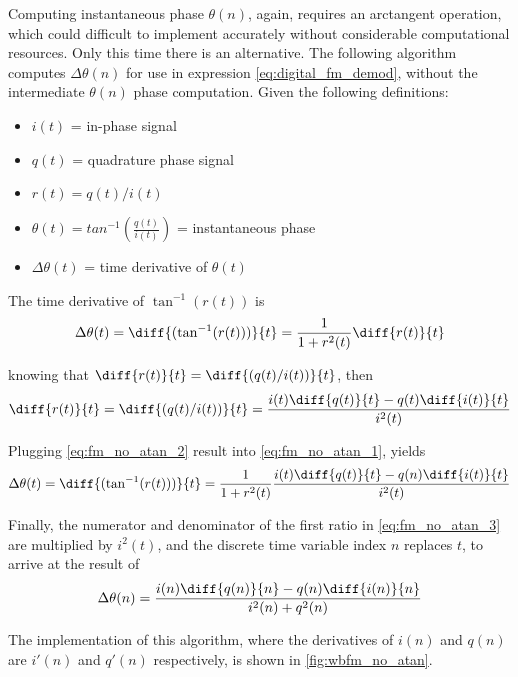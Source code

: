 Computing instantaneous phase $\theta(n)$, again, requires an arctangent operation, which could difficult to implement accurately without considerable computational resources. Only this time there is an alternative. The following algorithm computes $\Delta\theta(n)$ for use in expression \eqref{eq:digital_fm_demod}, without the intermediate $\theta(n)$ phase computation. Given the following definitions:
\begin{itemize}
  \item $i(t)$ = in-phase signal
  \item $q(t)$ = quadrature phase signal
  \item $r(t)=q(t)/i(t)$
  \item $\theta(t) = tan^{-1}\left(\frac{q(t)}{i(t)}\right)$ = instantaneous phase
  \item $\Delta\theta(t)$ = time derivative of $\theta(t)$
\end{itemize}

The time derivative of $\tan^{-1}(r(t))$ is
\begin{equation} \label{eq:fm_no_atan_1}
  \Delta\theta(t) = \diff{(\tan^{-1}(r(t)))}{t}=\frac{1}{1+r^2(t)}\diff{r(t)}{t}
\end{equation}

knowing that $\diff{r(t)}{t}=\diff{(q(t)/i(t))}{t}$, then
\begin{equation} \label{eq:fm_no_atan_2}
  \diff{r(t)}{t} = \diff{(q(t)/i(t))}{t} = \frac{i(t)\diff{q(t)}{t}-q(t)\diff{i(t)}{t}}{i^2(t)}
\end{equation}

Plugging \eqref{eq:fm_no_atan_2} result into \eqref{eq:fm_no_atan_1}, yields
\begin{equation} \label{eq:fm_no_atan_3}
  \Delta\theta(t) = \diff{(\tan^{-1}(r(t)))}{t}=\frac{1}{1+r^2(t)}\frac{i(t)\diff{q(t)}{t}-q(n)\diff{i(t)}{t}}{i^2(t)}
\end{equation}

Finally, the numerator and denominator of the first ratio in \eqref{eq:fm_no_atan_3} are multiplied by $i^2(t)$, and the discrete time variable index $n$ replaces $t$, to arrive at the result of
\begin{equation} \label{eq:fm_no_atan_4}
    \Delta\theta(n)= \frac{i(n)\diff{q(n)}{n}-q(n)\diff{i(n)}{n}}{i^2(n)+q^2(n)}
\end{equation}

The implementation of this algorithm, where the derivatives of $i(n)$ and $q(n)$ are $i'(n)$ and $q'(n)$ respectively, is shown in \autoref{fig:wbfm_no_atan}.

